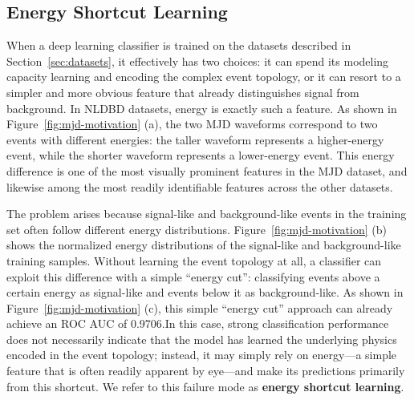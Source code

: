 \subsection{Energy Shortcut Learning}
\label{sec:energy-bias}

When a deep learning classifier is trained on the datasets described in Section~\ref{sec:datasets}, it effectively has two choices: it can spend its modeling capacity learning and encoding the complex event topology, or it can resort to a simpler and more obvious feature that already distinguishes signal from background. In NLDBD datasets, energy is exactly such a feature. As shown in Figure~\ref{fig:mjd-motivation} (a), the two MJD waveforms correspond to two events with different energies: the taller waveform represents a higher-energy event, while the shorter waveform represents a lower-energy event. This energy difference is one of the most visually prominent features in the MJD dataset, and likewise among the most readily identifiable features across the other datasets.

The problem arises because signal-like and background-like events in the training set often follow different energy distributions. Figure~\ref{fig:mjd-motivation} (b) shows the normalized energy distributions of the signal-like and background-like training samples. Without learning the event topology at all, a classifier can exploit this difference with a simple ``energy cut'': classifying events above a certain energy as signal-like and events below it as background-like. As shown in Figure~\ref{fig:mjd-motivation} (c), this simple ``energy cut'' approach can already achieve an ROC AUC of 0.9706.In this case, strong classification performance does not necessarily indicate that the model has learned the underlying physics encoded in the event topology; instead, it may simply rely on energy---a simple feature that is often readily apparent by eye---and make its predictions primarily from this shortcut. We refer to this failure mode as \textbf{energy shortcut learning}.




